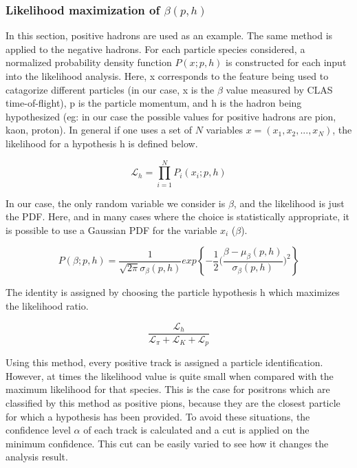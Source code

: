 
\subsubsection*{Likelihood maximization of $\beta(p,h)$}
In this section, positive hadrons are used as an example.  The same method is applied to the negative hadrons.  For each particle species considered, a normalized probability density function $P(x;p,h)$ is constructed for each input into the likelihood analysis.  Here, x corresponds to the feature being used to catagorize different particles (in our case, x is the $\beta$ value measured by CLAS time-of-flight), p is the particle momentum, and h is the hadron being hypothesized (eg: in our case the possible values for positive hadrons are pion, kaon, proton).  In general if one uses a set of $N$ variables $x = (x_1, x_2, ..., x_N)$, the likelihood for a hypothesis h is defined below.

\begin{equation}
  \mathcal{L}_h = \prod^{N}_{i=1} P_{i} (x_i; p, h)
\end{equation}

In our case, the only random variable we consider is $\beta$, and the likelihood is just the PDF.  Here, and in many cases where the choice is statistically appropriate, it is possible to use a Gaussian PDF for the variable $x_i$ ($\beta$).

\begin{equation}
  P(\beta;p,h) = \frac{1}{\sqrt{2 \pi} \sigma_\beta(p,h) } exp \left \{ -\frac{1}{2} \bigg( \frac{\beta - \mu_\beta(p,h)}{\sigma_\beta(p,h)} \bigg)^2 \right \}
\end{equation}

The identity is assigned by choosing the particle hypothesis h which maximizes the likelihood ratio.  
 
\begin{equation}
  \frac{\mathcal{L}_h}{\mathcal{L}_{\pi}+\mathcal{L}_{K}+\mathcal{L}_{p}}
\end{equation}

Using this method, every positive track is assigned a particle identification.  However, at times the likelihood value is quite small when compared with the maximum likelihood for that species.  This is the case for positrons which are classified by this method as positive pions, because they are the closest particle for which a hypothesis has been provided.  To avoid these situations, the confidence level $\alpha$ of each track is calculated and a cut is applied on the minimum confidence.  This cut can be easily varied to see how it changes the analysis result.

